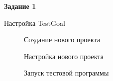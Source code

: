\documentclass[12pt, a4paper]{extarticle}
\begin{document}
\textbf{Задание 1}\par
Настройка TestGoal\par

\begin{figure}[h!]
	\caption{Создание нового проекта}
\end{figure}

\begin{figure}[h!]
	\caption{Настройка нового проекта}
\end{figure}

\newpage

\begin{figure}[h!]
	\caption{Запуск тестовой программы}
\end{figure}
\end{document}
